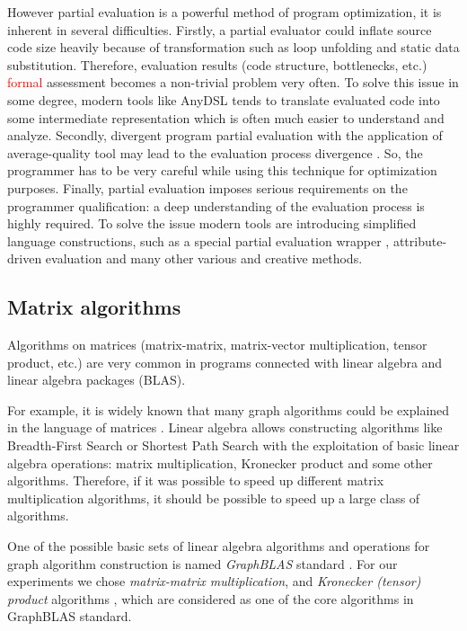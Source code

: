 \documentclass[conference]{IEEEtran}
\begin{document}
However partial evaluation is a powerful method of program optimization, it is inherent in several difficulties. Firstly, a partial evaluator could inflate source code size heavily because of transformation such as loop unfolding and static data substitution. Therefore, evaluation results (code structure, bottlenecks, etc.) \textcolor{red}{formal} assessment becomes a non-trivial problem very often. To solve this issue in some degree, modern tools like AnyDSL \cite{leissa2018anydsl} tends to translate evaluated code into some intermediate representation which is often much easier to understand and analyze. Secondly, divergent program partial evaluation with the application of average-quality tool may lead to the evaluation process divergence \cite{jones1993partial}. So, the programmer has to be very careful while using this technique for optimization purposes. Finally, partial evaluation imposes serious requirements on the programmer qualification: a deep understanding of the evaluation process is highly required. To solve the issue modern tools are introducing simplified language constructions, such as a special partial evaluation wrapper \cite{leissa2018anydsl}, attribute-driven evaluation \cite{10.1007/978-3-319-74313-4_27} and many other various and creative methods.

\subsection{Matrix algorithms}

Algorithms on matrices (matrix-matrix, matrix-vector multiplication, tensor product, etc.) are very common in programs connected with linear algebra and linear algebra packages (BLAS).

For example, it is widely known that many graph algorithms could be explained in the language of matrices \cite{kepner2011graph,davis2019algorithm}. Linear algebra allows constructing algorithms like Breadth-First Search or Shortest Path Search with the exploitation of basic linear algebra operations: matrix multiplication, Kronecker product and some other algorithms. Therefore, if it was possible to speed up different matrix multiplication algorithms, it should be possible to speed up a large class of algorithms. 

One of the possible basic sets of linear algebra algorithms and operations for graph algorithm construction is named \textit{GraphBLAS} standard \cite{davis2019algorithm,moreira2018implementing}. For our experiments we chose \textit{matrix-matrix multiplication}, and \textit{Kronecker (tensor) product} algorithms \cite{cormen2009introduction}, which are considered as one of the core algorithms in GraphBLAS standard.
\end{document}
